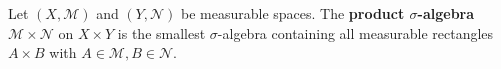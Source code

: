 Let $(X, \mathcal{M})$ and $(Y, \mathcal{N})$ be measurable spaces. The \textbf{product $\sigma$-algebra} $\mathcal{M} \times \mathcal{N}$ on $X \times Y$ is the smallest $\sigma$-algebra containing all measurable rectangles $A \times B$ with $A \in \mathcal{M}, B \in \mathcal{N}$.
